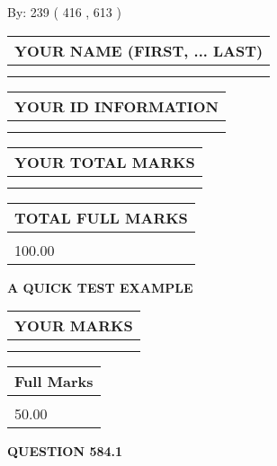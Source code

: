 \documentclass[12pt]{article}
\begin{document}
   
\hspace{1.0in} By: 
 239 ( 416 ,  613 )
   
   
   
   
\newpage 
\setcounter{page}{ 
   584001 } 
   
   
   
   
\noindent\begin{tabular}{|l|}
\hline
YOUR NAME (FIRST, ... LAST)  \\
\hline
 \\ 
 \\ 
\hline
\end{tabular}
\hspace{0.05in} \begin{tabular}{|l|}
\hline
 YOUR   ID   INFORMATION  \\
\hline
 \\ 
 \\ 
\hline
\end{tabular}
   
   
\vspace{0.2in}\noindent\begin{tabular}{|l|}
\hline
YOUR TOTAL MARKS  \\
\hline
 \\ 
 \\ 
\hline
\end{tabular}
\hspace{0.05in} \begin{tabular}{|l|}
\hline
TOTAL FULL MARKS  \\
\hline
 \\ 
100.00 \\
\hline
\end{tabular}
   
   
 \vspace{0.2in}
{\LARGE {\textbf{ A QUICK TEST EXAMPLE}}}
   
   
  
\vspace{0.2in}
  
\noindent\begin{tabular}{|l|}
\hline
 YOUR MARKS  \\
\hline
 \\ 
 \\ 
\hline
\end{tabular}
\hspace{0.05in} \begin{tabular}{|l|}
\hline
 Full Marks  \\
\hline
 \\ 
50.00 \\
\hline
\end{tabular}
{\textbf{\Large{QUESTION
584.1 
}}}
  
\end{document}
